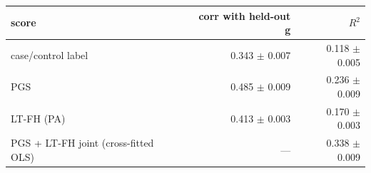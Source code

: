 \begin{tabular}{lrr}
\toprule
score & corr with held-out g & $R^2$ \\
\midrule
case/control label & 0.343 $\pm$ 0.007 & 0.118 $\pm$ 0.005 \\
PGS & 0.485 $\pm$ 0.009 & 0.236 $\pm$ 0.009 \\
LT-FH (PA) & 0.413 $\pm$ 0.003 & 0.170 $\pm$ 0.003 \\
PGS + LT-FH joint (cross-fitted OLS) & --- & 0.338 $\pm$ 0.009 \\
\bottomrule
\end{tabular}
